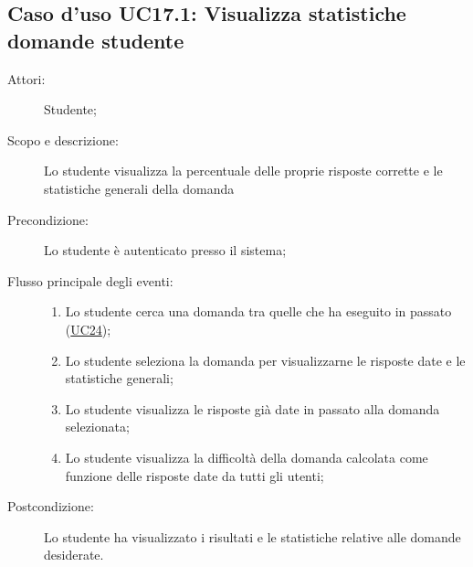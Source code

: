\subsection{Caso d'uso UC17.1: Visualizza statistiche domande studente}\begin{description}
\item[Attori:] Studente;
\item[Scopo e descrizione:] Lo studente visualizza la percentuale delle proprie risposte corrette e le statistiche generali della domanda
      \item[Precondizione:] Lo studente è autenticato presso il sistema;

        \item[Flusso principale degli eventi:] \begin{enumerate}
          \item Lo studente cerca una domanda tra quelle che ha eseguito in passato (\hyperlink{UC24}{UC24});
          \item Lo studente seleziona la domanda per visualizzarne le risposte date e le statistiche generali;
          \item Lo studente visualizza le risposte già date in passato alla domanda selezionata;
          \item Lo studente visualizza la difficoltà della domanda calcolata come funzione delle risposte date da tutti gli utenti;

      \end{enumerate}
    \item[Postcondizione:] Lo studente ha visualizzato i risultati e le statistiche relative alle domande desiderate.
  \end{description}
\hypertarget{UC17.2}{}
